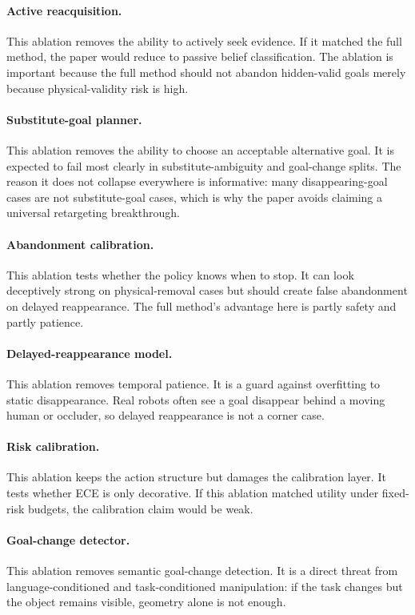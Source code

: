 \documentclass{article}
\begin{document}
\paragraph{Active reacquisition.}
This ablation removes the ability to actively seek evidence. If it matched the full method, the paper would reduce to passive belief classification. The ablation is important because the full method should not abandon hidden-valid goals merely because physical-validity risk is high.

\paragraph{Substitute-goal planner.}
This ablation removes the ability to choose an acceptable alternative goal. It is expected to fail most clearly in substitute-ambiguity and goal-change splits. The reason it does not collapse everywhere is informative: many disappearing-goal cases are not substitute-goal cases, which is why the paper avoids claiming a universal retargeting breakthrough.

\paragraph{Abandonment calibration.}
This ablation tests whether the policy knows when to stop. It can look deceptively strong on physical-removal cases but should create false abandonment on delayed reappearance. The full method's advantage here is partly safety and partly patience.

\paragraph{Delayed-reappearance model.}
This ablation removes temporal patience. It is a guard against overfitting to static disappearance. Real robots often see a goal disappear behind a moving human or occluder, so delayed reappearance is not a corner case.

\paragraph{Risk calibration.}
This ablation keeps the action structure but damages the calibration layer. It tests whether ECE is only decorative. If this ablation matched utility under fixed-risk budgets, the calibration claim would be weak.

\paragraph{Goal-change detector.}
This ablation removes semantic goal-change detection. It is a direct threat from language-conditioned and task-conditioned manipulation: if the task changes but the object remains visible, geometry alone is not enough.
\end{document}
